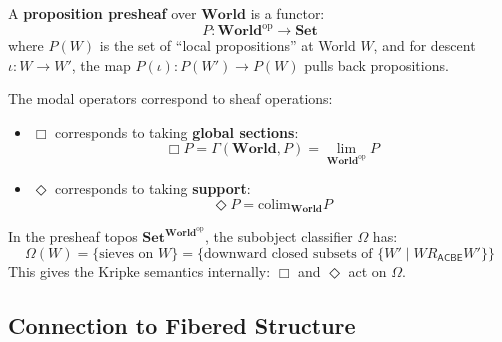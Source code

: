 \begin{definition}
\label{def:presheaf-propositions}
A \textbf{proposition presheaf} over $\mathbf{World}$ is a functor:
\[
  P : \mathbf{World}^{\mathrm{op}} \longrightarrow \mathbf{Set}
\]
where $P(W)$ is the set of ``local propositions'' at World $W$, and for
descent $\iota : W \to W'$, the map $P(\iota) : P(W') \to P(W)$ pulls back
propositions.
\end{definition}

\begin{proposition}
\label{prop:modal-sheaf-operations}
The modal operators correspond to sheaf operations:
\begin{itemize}
  \item $\Box$ corresponds to taking \textbf{global sections}:
        \[
          \Box P = \Gamma(\mathbf{World}, P) = \lim_{\mathbf{World}^{\mathrm{op}}} P
        \]
  \item $\Diamond$ corresponds to taking \textbf{support}:
        \[
          \Diamond P = \mathrm{colim}_{\mathbf{World}} P
        \]
\end{itemize}
\end{proposition}

\begin{definition}
\label{def:modal-subobject-classifier}
In the presheaf topos $\mathbf{Set}^{\mathbf{World}^{\mathrm{op}}}$, the
subobject classifier $\Omega$ has:
\[
  \Omega(W) = \{\text{sieves on } W\} = \{\text{downward closed subsets of } \{W' \mid W \mathrel{R_{\mathsf{ACBE}}} W'\}\}
\]
This gives the Kripke semantics internally: $\Box$ and $\Diamond$ act on $\Omega$.
\end{definition}

\subsection{Connection to Fibered Structure}
\label{subsec:modal-fibered-connection}

